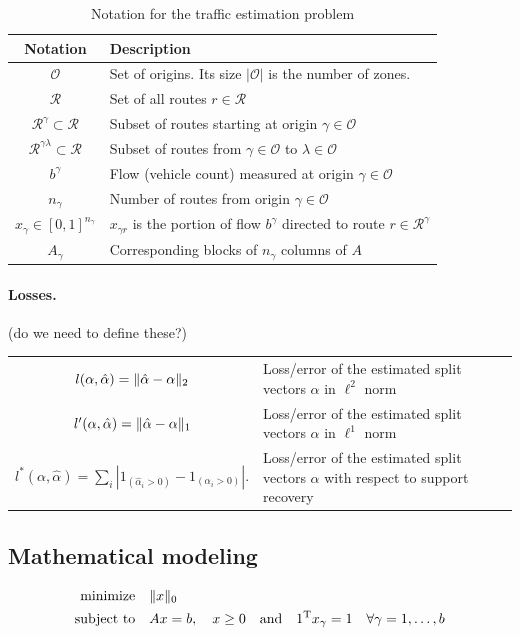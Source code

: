 \documentclass{article} %
\newcommand{\OO}{\mathcal{O}}
\newcommand{\RR}{\mathcal{R}}
\begin{document}
\begin{table}[htbp]
\caption{Notation for the traffic estimation problem}
\label{tab-notation}
\centering
\begin{tabular}{cl}
\toprule
Notation & Description \\
\midrule
$\OO$ & Set of origins. Its size $|\OO|$ is the number of zones. \\
$\RR$ & Set of all routes $r\in \RR$\\
$\RR^\gamma \subset\RR$ & Subset of routes starting at origin $\gamma\in\OO$ \\
$\RR^{\gamma \lambda} \subset\RR$ & Subset of routes from $\gamma\in\OO$ to $\lambda\in \OO$ \\
$b^\gamma$ & Flow (vehicle count) measured at origin $\gamma\in\OO$ \\
$n_\gamma$ & Number of routes from origin $\gamma\in \OO$\\
$x_\gamma \in[0, 1]^{n_\gamma}$ & $x_{\gamma r}$ is the portion of flow $b^\gamma$ directed to route $r \in \RR^\gamma$ \\
$A_{\gamma}$ & Corresponding blocks of $n_{\gamma}$ columns of $A$\\
\bottomrule
\end{tabular}
\end{table}

\paragraph{Losses.} (do we need to define these?)

\begin{tabular}{cl}
$l(\alpha, \hat\alpha) = \lVert\hat\alpha - \alpha\rVert_2$ & Loss/error of the estimated split vectors $\alpha$ in $\ell^2$ norm \\
$l'(\alpha, \hat\alpha) = \lVert\hat\alpha - \alpha\rVert_1$ & Loss/error of the estimated split vectors $\alpha$ in $\ell^1$ norm \\
$l^*(\alpha, \hat \alpha) = \sum_{i}|1_{(\hat{\alpha}_i > 0)} - 1_{(\alpha_i > 0)}|.$ & Loss/error of the estimated split vectors $\alpha$ with respect to support recovery
\end{tabular}

\subsection{Mathematical modeling}
\begin{equation}\label{l0-minimization}
  \begin{split}
    \text{minimize} &\quad \lVert x\rVert_0\\
    \text{subject to} &\quad Ax = b,\quad x\geq 0\quad \text{and}\quad 1^{\rm T} x_{\gamma} = 1\quad \forall \gamma=1,\dots, b
  \end{split}
\end{equation}
\end{document}

